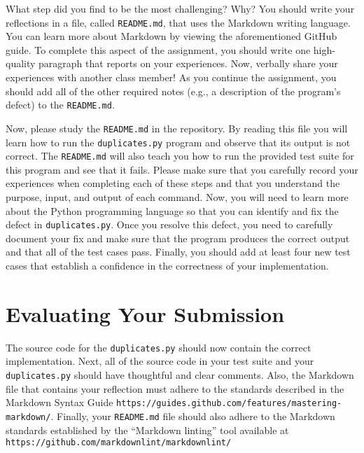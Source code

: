 \documentclass[11pt]{article}
\newcommand{\mainprogram}{\lstinline{duplicates.py}}
\newcommand{\reflection}{\lstinline{README.md}}
\newcommand{\url}[1]{\lstinline{#1}}
\newcommand{\step}[1]{``{#1}''}
\begin{document}
What step did you find to be the most challenging? Why? You should write your reflections in a file, called
\reflection{}, that uses the Markdown writing language. You can learn more about Markdown by viewing the aforementioned
GitHub guide. To complete this aspect of the assignment, you should write one high-quality paragraph that reports on
your experiences. Now, verbally share your experiences with another class member! As you continue the assignment, you
should add all of the other required notes (e.g., a description of the program's defect) to the \reflection{}.

Now, please study the \reflection{} in the repository. By reading this file you will learn how to run the
\mainprogram{} program and observe that its output is not correct. The \reflection{} will also teach you how to run the
provided test suite for this program and see that it fails. Please make sure that you carefully record your experiences
when completing each of these steps and that you understand the purpose, input, and output of each command. Now, you
will need to learn more about the Python programming language so that you can identify and fix the defect in
\mainprogram{}. Once you resolve this defect, you need to carefully document your fix and make sure that the program
produces the correct output and that all of the test cases pass. Finally, you should add at least four new test cases
that establish a confidence in the correctness of your implementation.

\section*{Evaluating Your Submission}

The source code for the \mainprogram{} should now contain the correct implementation. Next, all of the source code in
your test suite and your \mainprogram{} should have thoughtful and clear comments. Also, the Markdown file that contains
your reflection must adhere to the standards described in the Markdown Syntax Guide
\url{https://guides.github.com/features/mastering-markdown/}. Finally, your \reflection{} file should also adhere to the
Markdown standards established by the \step{Markdown linting} tool available at
\url{https://github.com/markdownlint/markdownlint/}
\end{document}
